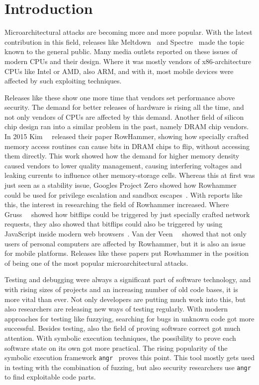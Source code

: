 \chapter{Introduction}\label{sec:intro}

Microarchitectural attacks are becoming more and more popular. With the latest
contribution in this field, releases like Meltdown~\cite{meltdown} and
Spectre~\cite{spectre} made the topic known to the general public. Many media
outlets reported on these issues of modern CPUs and their design. Where it was
mostly vendors of x86-architecture CPUs like Intel or AMD, also ARM, and with
it, most mobile devices were affected by such exploiting techniques.

Releases like these show one more time that vendors set performance above
security. The demand for better releases of hardware is rising all the time, and
not only vendors of CPUs are affected by this demand. Another field of silicon
chip design ran into a similar problem in the past, namely DRAM chip vendors. In
2015 Kim~\etal~\cite{rowhammergeneral} released their paper \textquotedbl
RowHammer\textquotedbl, showing how specially crafted memory access routines
can cause bits in DRAM chips to flip, without accessing them directly. This
work showed how the demand for higher memory density caused vendors to lower
quality management, causing interfering voltages and leaking currents to
influence other memory-storage cells. Whereas this at first was just seen as a
stability issue, Google\textquotesingle s Project Zero showed how Rowhammer
could be used for privilege escalation and sandbox
escapes~\cite{projectzerorow}. With reports like this, the interest in
researching the field of Rowhammer increased. Where Gruss~\etal~\cite{nethammer}
showed how bitflips could be triggered by just specially crafted network
requests, they also showed that bitflips could also be triggered by using
JavaScript inside modern web browsers~\cite{rowhammerjs}. Van der
Veen~\etal~\cite{drammer} showed that not only users of personal computers are
affected by Rowhammer, but it is also an issue for mobile platforms. Releases
like these papers put Rowhammer in the position of being one of the most popular
microarchitectural attacks.

Testing and debugging were always a significant part of software technology, and
with rising sizes of projects and an increasing number of old code bases, it is
more vital than ever. Not only developers are putting much work into this, but
also researchers are releasing new ways of testing regularly. With modern
approaches for testing like fuzzying, searching for bugs in unknown code got
more successful. Besides testing, also the field of proving software correct got
much attention. With symbolic execution techniques, the possibility to prove
each software state on its own got more practical. The rising popularity of the
symbolic execution framework \texttt{angr}~\cite{angrpaper} proves this point.
This tool mostly gets used in testing with the combination of fuzzing, but also
security researchers use \texttt{angr} to find exploitable code parts.

